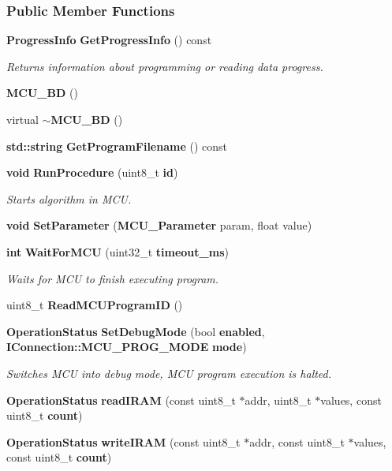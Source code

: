 \subsubsection*{Public Member Functions}
\begin{DoxyCompactItemize}
\item 
{\bf Progress\+Info} {\bf Get\+Progress\+Info} () const 
\begin{DoxyCompactList}\small\item\em Returns information about programming or reading data progress. \end{DoxyCompactList}\item 
{\bf M\+C\+U\+\_\+\+BD} ()
\item 
virtual {\bf $\sim$\+M\+C\+U\+\_\+\+BD} ()
\item 
{\bf std\+::string} {\bf Get\+Program\+Filename} () const 
\item 
{\bf void} {\bf Run\+Procedure} (uint8\+\_\+t {\bf id})
\begin{DoxyCompactList}\small\item\em Starts algorithm in M\+CU. \end{DoxyCompactList}\item 
{\bf void} {\bf Set\+Parameter} ({\bf M\+C\+U\+\_\+\+Parameter} param, float value)
\item 
{\bf int} {\bf Wait\+For\+M\+CU} (uint32\+\_\+t {\bf timeout\+\_\+ms})
\begin{DoxyCompactList}\small\item\em Waits for M\+CU to finish executing program. \end{DoxyCompactList}\item 
uint8\+\_\+t {\bf Read\+M\+C\+U\+Program\+ID} ()
\item 
{\bf Operation\+Status} {\bf Set\+Debug\+Mode} (bool {\bf enabled}, {\bf I\+Connection\+::\+M\+C\+U\+\_\+\+P\+R\+O\+G\+\_\+\+M\+O\+DE} {\bf mode})
\begin{DoxyCompactList}\small\item\em Switches M\+CU into debug mode, M\+CU program execution is halted. \end{DoxyCompactList}\item 
{\bf Operation\+Status} {\bf read\+I\+R\+AM} (const uint8\+\_\+t $\ast$addr, uint8\+\_\+t $\ast$values, const uint8\+\_\+t {\bf count})
\item 
{\bf Operation\+Status} {\bf write\+I\+R\+AM} (const uint8\+\_\+t $\ast$addr, const uint8\+\_\+t $\ast$values, const uint8\+\_\+t {\bf count})
\item 

\end{DoxyCompactItemize}
